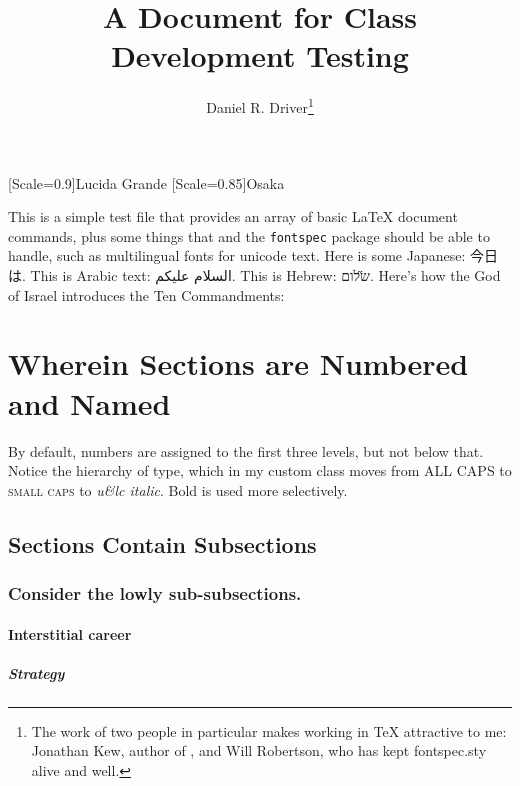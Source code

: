 \documentclass[11pt,twocolumn]{drd-article}
\title{A Document for Class Development Testing}
\author{Daniel R. Driver\thanks{The work of two people in particular makes working in 
\TeX{}  attractive to me: Jonathan Kew, author of \XeTeX, and Will Robertson, who has 
kept fontspec.sty alive and well.}}
\begin{document}
\maketitle

\newfontfamily{\H}[Scale=0.9]{Lucida Grande}
\newfontfamily{\J}[Scale=0.85]{Osaka}

This is a simple test file that provides an array of basic \LaTeX{} document commands,
plus some things that \XeTeX and the \verb=fontspec= package should be able to handle,
such as multilingual fonts for unicode text. Here is some Japanese: {\J 今日は}. This 
is Arabic text: {\A السلام عليكم}. This is Hebrew: {\H שלום}. Here's how the God of Israel
introduces the Ten Commandments:

\setLR

\section{Wherein Sections are Numbered and Named}
By default, numbers are assigned to the first three levels, but not below that. Notice the 
hierarchy of type, which in my custom class moves from ALL CAPS to \textsc{small caps} to 
\emph{u\&lc italic}. Bold is used more selectively.

\lipsum[1]

\subsection{Sections Contain Subsections}

\lipsum[2]

\subsubsection{Consider the lowly sub-subsections.}
\lipsum[3]

\begin{quotation}
\lipsum[4-5]
\end{quotation}

\lipsum[6]

\paragraph{Interstitial career}
\lipsum[7]

\subparagraph{Strategy}

\lipsum[8]
\end{document}
